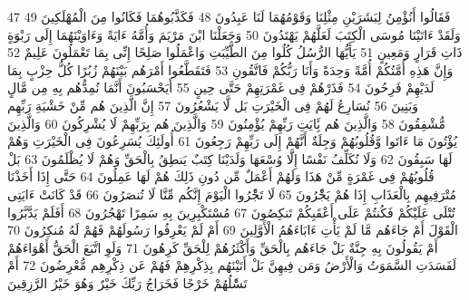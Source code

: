 \documentclass[20pt,a4paper]{article}
\begin{document}
{\tiny\colorbox{cl_aya}{47}} فَقَالُوا أَنُؤْمِنُ لِبَشَرَيْنِ مِثْلِنَا وَقَوْمُهُمَا لَنَا عَبِدُونَ
{\tiny\colorbox{cl_aya}{48}} فَكَذَّبُوهُمَا فَكَانُوا مِنَ الْمُهْلَكِينَ
{\tiny\colorbox{cl_aya}{49}} وَلَقَدْ ءَاتَيْنَا مُوسَى الْكِتَبَ لَعَلَّهُمْ يَهْتَدُونَ
{\tiny\colorbox{cl_aya}{50}} وَجَعَلْنَا ابْنَ مَرْيَمَ وَأُمَّهُ ءَايَةً وَءَاوَيْنَهُمَا إِلَى رَبْوَةٍ ذَاتِ قَرَارٍ وَمَعِينٍ
{\tiny\colorbox{cl_aya}{51}} يَأَيُّهَا الرُّسُلُ كُلُوا مِنَ الطَّيِّبَتِ وَاعْمَلُوا صَلِحًا إِنِّى بِمَا تَعْمَلُونَ عَلِيمٌ
{\tiny\colorbox{cl_aya}{52}} وَإِنَّ هَذِهِ أُمَّتُكُمْ أُمَّةً وَحِدَةً وَأَنَا رَبُّكُمْ فَاتَّقُونِ
{\tiny\colorbox{cl_aya}{53}} فَتَقَطَّعُوا أَمْرَهُم بَيْنَهُمْ زُبُرًا كُلُّ حِزْبٍ بِمَا لَدَيْهِمْ فَرِحُونَ
{\tiny\colorbox{cl_aya}{54}} فَذَرْهُمْ فِى غَمْرَتِهِمْ حَتَّى حِينٍ
{\tiny\colorbox{cl_aya}{55}} أَيَحْسَبُونَ أَنَّمَا نُمِدُّهُم بِهِ مِن مَّالٍ وَبَنِينَ
{\tiny\colorbox{cl_aya}{56}} نُسَارِعُ لَهُمْ فِى الْخَيْرَتِ بَل لَّا يَشْعُرُونَ
{\tiny\colorbox{cl_aya}{57}} إِنَّ الَّذِينَ هُم مِّنْ خَشْيَةِ رَبِّهِم مُّشْفِقُونَ
{\tiny\colorbox{cl_aya}{58}} وَالَّذِينَ هُم بَِٔايَتِ رَبِّهِمْ يُؤْمِنُونَ
{\tiny\colorbox{cl_aya}{59}} وَالَّذِينَ هُم بِرَبِّهِمْ لَا يُشْرِكُونَ
{\tiny\colorbox{cl_aya}{60}} وَالَّذِينَ يُؤْتُونَ مَا ءَاتَوا وَّقُلُوبُهُمْ وَجِلَةٌ أَنَّهُمْ إِلَى رَبِّهِمْ رَجِعُونَ
{\tiny\colorbox{cl_aya}{61}} أُولَئِكَ يُسَرِعُونَ فِى الْخَيْرَتِ وَهُمْ لَهَا سَبِقُونَ
{\tiny\colorbox{cl_aya}{62}} وَلَا نُكَلِّفُ نَفْسًا إِلَّا وُسْعَهَا وَلَدَيْنَا كِتَبٌ يَنطِقُ بِالْحَقِّ وَهُمْ لَا يُظْلَمُونَ
{\tiny\colorbox{cl_aya}{63}} بَلْ قُلُوبُهُمْ فِى غَمْرَةٍ مِّنْ هَذَا وَلَهُمْ أَعْمَلٌ مِّن دُونِ ذَلِكَ هُمْ لَهَا عَمِلُونَ
{\tiny\colorbox{cl_aya}{64}} حَتَّى إِذَا أَخَذْنَا مُتْرَفِيهِم بِالْعَذَابِ إِذَا هُمْ يَجَْٔرُونَ
{\tiny\colorbox{cl_aya}{65}} لَا تَجَْٔرُوا الْيَوْمَ إِنَّكُم مِّنَّا لَا تُنصَرُونَ
{\tiny\colorbox{cl_aya}{66}} قَدْ كَانَتْ ءَايَتِى تُتْلَى عَلَيْكُمْ فَكُنتُمْ عَلَى أَعْقَبِكُمْ تَنكِصُونَ
{\tiny\colorbox{cl_aya}{67}} مُسْتَكْبِرِينَ بِهِ سَمِرًا تَهْجُرُونَ
{\tiny\colorbox{cl_aya}{68}} أَفَلَمْ يَدَّبَّرُوا الْقَوْلَ أَمْ جَاءَهُم مَّا لَمْ يَأْتِ ءَابَاءَهُمُ الْأَوَّلِينَ
{\tiny\colorbox{cl_aya}{69}} أَمْ لَمْ يَعْرِفُوا رَسُولَهُمْ فَهُمْ لَهُ مُنكِرُونَ
{\tiny\colorbox{cl_aya}{70}} أَمْ يَقُولُونَ بِهِ جِنَّةٌ بَلْ جَاءَهُم بِالْحَقِّ وَأَكْثَرُهُمْ لِلْحَقِّ كَرِهُونَ
{\tiny\colorbox{cl_aya}{71}} وَلَوِ اتَّبَعَ الْحَقُّ أَهْوَاءَهُمْ لَفَسَدَتِ السَّمَوَتُ وَالْأَرْضُ وَمَن فِيهِنَّ بَلْ أَتَيْنَهُم بِذِكْرِهِمْ فَهُمْ عَن ذِكْرِهِم مُّعْرِضُونَ
{\tiny\colorbox{cl_aya}{72}} أَمْ تَسَْٔلُهُمْ خَرْجًا فَخَرَاجُ رَبِّكَ خَيْرٌ وَهُوَ خَيْرُ الرَّزِقِينَ
\end{document}
